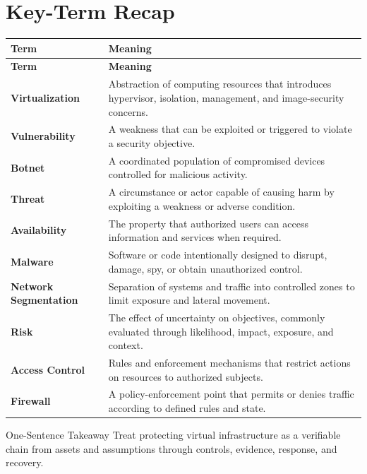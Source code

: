 \documentclass[11pt,letterpaper]{article}
\begin{document}
\section*{Key-Term Recap}
\begin{longtable}{>{\raggedright\arraybackslash}p{}>{\raggedright\arraybackslash}p{}}
\toprule\rowcolor{Navy}\color{white}\textbf{Term} & \color{white}\textbf{Meaning}\\\midrule
\endfirsthead
\toprule\rowcolor{Navy}\color{white}\textbf{Term} & \color{white}\textbf{Meaning}\\\midrule
\endhead
\textbf{Virtualization} & Abstraction of computing resources that introduces hypervisor, isolation, management, and image-security concerns. \\\midrule
\textbf{Vulnerability} & A weakness that can be exploited or triggered to violate a security objective. \\\midrule
\textbf{Botnet} & A coordinated population of compromised devices controlled for malicious activity. \\\midrule
\textbf{Threat} & A circumstance or actor capable of causing harm by exploiting a weakness or adverse condition. \\\midrule
\textbf{Availability} & The property that authorized users can access information and services when required. \\\midrule
\textbf{Malware} & Software or code intentionally designed to disrupt, damage, spy, or obtain unauthorized control. \\\midrule
\textbf{Network Segmentation} & Separation of systems and traffic into controlled zones to limit exposure and lateral movement. \\\midrule
\textbf{Risk} & The effect of uncertainty on objectives, commonly evaluated through likelihood, impact, exposure, and context. \\\midrule
\textbf{Access Control} & Rules and enforcement mechanisms that restrict actions on resources to authorized subjects. \\\midrule
\textbf{Firewall} & A policy-enforcement point that permits or denies traffic according to defined rules and state. \\\midrule
\bottomrule
\end{longtable}
\begin{CornellExamBox}{One-Sentence Takeaway}
Treat protecting virtual infrastructure as a verifiable chain from assets and assumptions through controls, evidence, response, and recovery.
\end{CornellExamBox}
\end{document}
